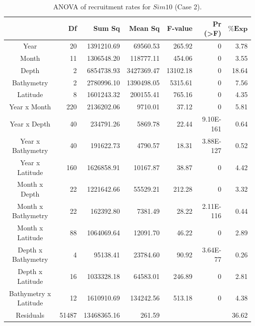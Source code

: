 \begin{table}[H]
\centering
\caption{ANOVA of recruitment rates for $Sim 10$ (Case 2).}
\begin{adjustbox}{width=0.9\textwidth}
\small
\begin{tabular}{c|r|r|r|r|r|r}
\toprule
                                  &
	\textbf{Df}                   &
	\textbf{Sum Sq}               &
	\textbf{Mean Sq}              &
	\textbf{F-value}    		   &
	\textbf{Pr (\textgreater{F})} &
	$\mathbf{\% Exp}$      \\
\midrule
Year                  & 20    & 1391210.69  & 69560.53   & 265.92   & 0                   & 3.78  \\
Month                 & 11    & 1306548.20  & 118777.11  & 454.06   & 0                   & 3.55  \\
Depth                 & 2     & 6854738.93  & 3427369.47 & 13102.18 & 0                   & 18.64 \\
Bathymetry            & 2     & 2780996.10  & 1390498.05 & 5315.61  & 0                   & 7.56  \\
Latitude              & 8     & 1601243.32  & 200155.41  & 765.16   & 0                   & 4.35  \\
Year x Month          & 220   & 2136202.06  & 9710.01    & 37.12    & 0                   & 5.81  \\
Year x Depth          & 40    & 234791.26   & 5869.78    & 22.44    & 9.10E-161           & 0.64  \\
Year x Bathymetry     & 40    & 191622.73   & 4790.57    & 18.31    & 3.88E-127           & 0.52  \\
Year x Latitude       & 160   & 1626858.91  & 10167.87   & 38.87    & 0                   & 4.42  \\
Month x Depth         & 22    & 1221642.66  & 55529.21   & 212.28   & 0                   & 3.32  \\
Month x Bathymetry    & 22    & 162392.80   & 7381.49    & 28.22    & 2.11E-116           & 0.44  \\
Month x Latitude      & 88    & 1064069.64  & 12091.70   & 46.22    & 0                   & 2.89  \\
Depth x Bathymetry    & 4     & 95138.41    & 23784.60   & 90.92    & 3.64E-77            & 0.26  \\
Depth x Latitude      & 16    & 1033328.18  & 64583.01   & 246.89   & 0                   & 2.81  \\
Bathymetry x Latitude & 12    & 1610910.69  & 134242.56  & 513.18   & 0                   & 4.38  \\
Residuals             & 51487 & 13468365.16 & 261.59     &          &                     & 36.62 \\
\bottomrule
\end{tabular}
\end{adjustbox}
\label{Chap3ANOVAsim10}
\end{table}

